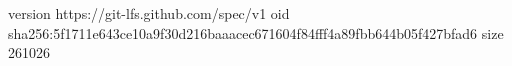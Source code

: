 version https://git-lfs.github.com/spec/v1
oid sha256:5f1711e643ce10a9f30d216baaacec671604f84fff4a89fbb644b05f427bfad6
size 261026
